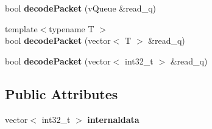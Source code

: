\begin{DoxyCompactItemize}
bool {\bfseries decode\+Packet} (v\+Queue \&read\+\_\+q)
\item 
\mbox{\label{classev_1_1vPortableInterface_abe80d47ae0323e6245b0e7a2aa0aac78}} 
{\footnotesize template$<$typename T $>$ }\\bool {\bfseries decode\+Packet} (vector$<$ T $>$ \&read\+\_\+q)
\item 
\mbox{\label{classev_1_1vPortableInterface_acac49767e0f87e2be5185d373f629097}} 
bool {\bfseries decode\+Packet} (vector$<$ int32\+\_\+t $>$ \&read\+\_\+q)
\end{DoxyCompactItemize}
\subsection*{Public Attributes}
\begin{DoxyCompactItemize}
\item 
\mbox{\label{classev_1_1vPortableInterface_ae8efe8cb3e40fc651d359073e6f53396}} 
vector$<$ int32\+\_\+t $>$ {\bfseries internaldata}
\end{DoxyCompactItemize}
